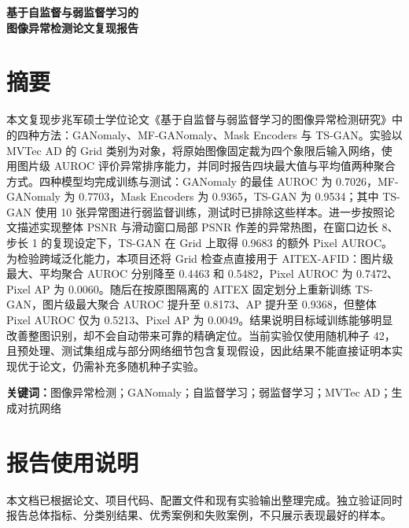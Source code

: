 \documentclass[UTF8,12pt]{ctexart}
\begin{document}
\begin{titlepage}
  \thispagestyle{empty}
  \centering
  \vspace*{\fill}
  {\heiti{}\bfseries 基于自监督与弱监督学习的\\[0.5em]图像异常检测论文复现报告\par}
  \vspace*{\fill}
\end{titlepage}


\section*{摘要}

本文复现步兆军硕士学位论文《基于自监督与弱监督学习的图像异常检测研究》中的四种方法：GANomaly、MF-GANomaly、Mask Encoders 与 TS-GAN。实验以 MVTec AD 的 Grid 类别为对象，将原始图像固定裁为四个象限后输入网络，使用图片级 AUROC 评价异常排序能力，并同时报告四块最大值与平均值两种聚合方式。四种模型均完成训练与测试：GANomaly 的最佳 AUROC 为 0.7026，MF-GANomaly 为 0.7703，Mask Encoders 为 0.9365，TS-GAN 为 0.9534；其中 TS-GAN 使用 10 张异常图进行弱监督训练，测试时已排除这些样本。进一步按照论文描述实现整体 PSNR 与滑动窗口局部 PSNR 作差的异常热图，在窗口边长 8、步长 1 的复现设定下，TS-GAN 在 Grid 上取得 0.9683 的额外 Pixel AUROC。为检验跨域泛化能力，本项目还将 Grid 检查点直接用于 AITEX-AFID：图片级最大、平均聚合 AUROC 分别降至 0.4463 和 0.5482，Pixel AUROC 为 0.7472、Pixel AP 为 0.0060。随后在按原图隔离的 AITEX 固定划分上重新训练 TS-GAN，图片级最大聚合 AUROC 提升至 0.8173、AP 提升至 0.9368，但整体 Pixel AUROC 仅为 0.5213、Pixel AP 为 0.0049。结果说明目标域训练能够明显改善整图识别，却不会自动带来可靠的精确定位。当前实验仅使用随机种子 42，且预处理、测试集组成与部分网络细节包含复现假设，因此结果不能直接证明本实现优于论文，仍需补充多随机种子实验。

\noindent\textbf{关键词：}图像异常检测；GANomaly；自监督学习；弱监督学习；MVTec AD；生成对抗网络

\section*{报告使用说明}

本文档已根据论文、项目代码、配置文件和现有实验输出整理完成。独立验证同时报告总体指标、分类别结果、优秀案例和失败案例，不只展示表现最好的样本。

\tableofcontents
\clearpage
{}
\end{document}
